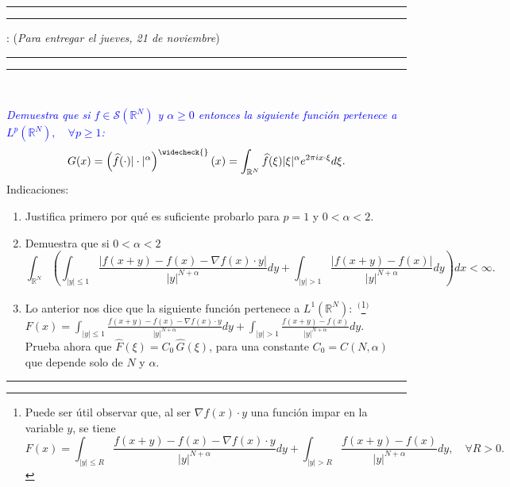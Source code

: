 \documentclass[11pt,a4paper]{article}
\newcommand{\blue}{\textcolor{blue}}
\begin{document}
\hrule\hrule
\vspace{2mm}


\vspace{3mm}

 : \hfill ({\small \it Para entregar el jueves, 21 de noviembre})

\vspace{2mm}

\hrule\hrule

\vspace{2mm}

\

 \blue{\em Demuestra que si $f\in\mathscr{S}(\mathbb R^N)$ y $\alpha\ge 0$ entonces la siguiente función pertenece a   $L^p(\mathbb R^N), \quad \forall p\ge 1$:
$$
G(x)=\left(\widehat f(\cdot)|\cdot|^\alpha\right)^{\widecheck{}}(x)=\int_{\mathbb R^N}
\widehat f(\xi)|\xi|^\alpha e^{2\pi ix\cdot\xi}d\xi.
$$}
\vskip -2mm
{\sc Indicaciones}: 
\begin{enumerate}
\item Justifica primero por qué es suficiente probarlo para  $p=1$ y $0<\alpha<2$. 
\item Demuestra que si $0<\alpha<2$ 
$$\displaystyle\int_{\mathbb R^N}\left(\int_{|y|\le 1}\frac{|f(x+y)-f(x)-\nabla f(x)\cdot y|}{|y|^{N+\alpha}}dy+
\int_{|y|>1}\frac{|f(x+y)-f(x)|}{|y|^{N+\alpha}}dy\right)dx<\infty.$$ 

\item  Lo anterior nos dice que la siguiente función  pertenece a $L^1(\mathbb R^N):$ ${}^($\footnote{ Puede ser útil observar que, al ser 
$\nabla f(x)\cdot y$ una función impar en la variable  $y$, se tiene $$F(x)=\displaystyle\int_{|y|\le R}\frac{f(x+y)-f(x)-\nabla f(x)\cdot y}{|y|^{N+\alpha}}dy+
\int_{|y|>R}\frac{f(x+y)-f(x)}{|y|^{N+\alpha}}dy, \quad \forall R>0.$$}${}^)$
 \\[2mm]
$F(x)=\displaystyle\int_{|y|\le 1}\frac{f(x+y)-f(x)-\nabla f(x)\cdot y}{|y|^{N+\alpha}}dy+
\int_{|y|>1}\frac{f(x+y)-f(x)}{|y|^{N+\alpha}}dy.$    \\[1mm]
Prueba ahora que $\widehat F(\xi)=C_0\,\widehat G(\xi)$, para una constante $C_0=C(N,\alpha)$ que depende solo de  $N$ y $\alpha$.
\end{enumerate}
\vskip 6mm
\hrule
\vskip 5mm
\end{document}
